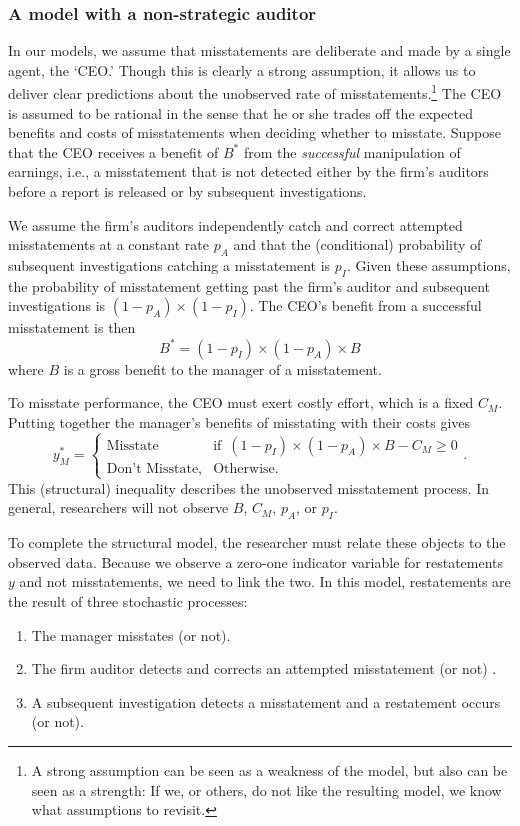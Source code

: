 \subsubsection{A model with a non-strategic auditor}
In our models, we assume that misstatements  are deliberate and made by a single agent, the `CEO.'
Though this is clearly a strong assumption, it allows us to deliver clear predictions about the unobserved rate of misstatements.\footnote{
A strong assumption can be seen as a weakness of the model, but also can be seen as a strength:
If we, or others, do not like the resulting model, we know what assumptions to revisit.} 
The CEO is assumed to be rational in the sense that he or she trades off the expected benefits and costs of misstatements when deciding whether to misstate.
Suppose that the CEO receives a benefit of $B^*$ from the \emph{successful} manipulation of earnings, 
i.e., a misstatement that is not detected either by the firm's auditors before a report is released or by subsequent investigations. 

We assume the firm's auditors independently catch and correct attempted misstatements at a constant rate $p_A$ and that the (conditional) probability of subsequent investigations catching a misstatement is $p_I$.
Given these assumptions, the probability of misstatement getting past the firm's  auditor and subsequent investigations is $(1-p_A) \times (1 - p_I)$.
The CEO's benefit from a successful misstatement is then
$$ B^* = (1-p_I) \times (1-p_A) \times B$$
where $B$ is a gross benefit to the manager of a misstatement. 

To misstate performance, the CEO must exert costly effort, which is a fixed $C_M$. 
Putting together the manager's benefits of misstating with their costs gives
\begin{equation}\label{bencost}
		y_M^* = 
		  \begin{cases}
				\mbox{Misstate} & \mbox{if }\, (1-p_I) \times (1-p_A) \times B - C_M \ge 0\\
				\mbox{Don't Misstate,} & \mbox{Otherwise}.
		  \end{cases}.
\end{equation}
This (structural) inequality describes the unobserved misstatement process. 
In general, researchers will not observe $B$, $C_M$, $p_A$, or $p_I$.

To complete the structural model, the researcher must relate these objects to the observed data.
Because we observe a zero-one indicator variable for restatements $y$ and not misstatements, we need to link the two. 
In this model, restatements are the result of three stochastic processes:
\begin{enumerate}
\item The manager misstates (or not).
\item The firm auditor detects and corrects an attempted misstatement (or not) .
\item A subsequent investigation detects a misstatement and a restatement occurs (or not).
\end{enumerate}

